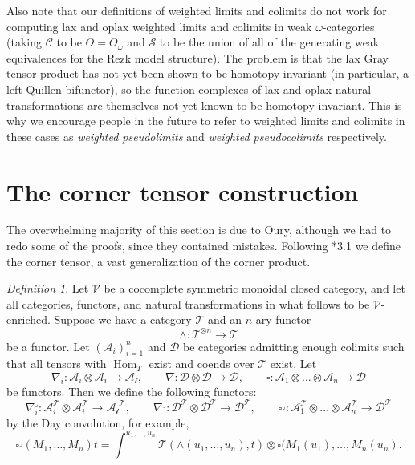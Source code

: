 \documentclass{amsart}
\numberwithin{equation}{section}
\theoremstyle{plain}   %
\theoremstyle{remark}
\newtheorem{defn}[subsection]{Definition}
\theoremstyle{plain}
\DeclareMathOperator{\Hom}{Hom}
\newcommand{\C}{\ensuremath{\mathcal{C}}}
\newcommand{\setS}{\ensuremath{\mathscr{S}}}
\begin{document}
Also note that our definitions of weighted limits and colimits do not work for computing lax and oplax weighted limits and colimits in weak \(\omega\)-categories (taking \(\C\) to be \(\Theta=\Theta_\omega\) and \(\setS\) to be the union of all of the generating weak equivalences for the Rezk model structure).  The problem is that the lax Gray tensor product has not yet been shown to be homotopy-invariant (in particular, a left-Quillen bifunctor), so the function complexes of lax and oplax natural transformations are themselves not yet known to be homotopy invariant.  This is why we encourage people in the future to refer to weighted limits and colimits in these cases as \emph{weighted pseudolimits} and \emph{weighted pseudocolimits} respectively.


\appendix
\renewcommand{\thesection}{A.\arabic{section}}
\section{The corner tensor construction}\label{cornertensor} 
The overwhelming majority of this section is due to Oury, although we had to redo some of the proofs, since they contained mistakes. Following \cite{oury}*{3.1} we define the corner tensor, a vast generalization of the corner product.
\begin{defn}
	Let \(\mathcal{V}\) be a cocomplete symmetric monoidal closed category, and let all categories, functors, and natural transformations in what follows to be \(\mathcal{V}\)-enriched.  Suppose we have a category \(\mathcal{T}\) and an \(n\)-ary functor \[\wedge:\mathcal{T}^{\otimes n} \to \mathcal{T}\] be a functor.  Let \((\mathcal{A}_i)_{i=1}^n\) and \(\mathcal{D}\) be categories admitting enough colimits such that all tensors with \(\Hom_T\) exist and coends over \(\mathcal{T}\) exist.  Let
	\[\nabla_i: \mathcal{A}_i \otimes \mathcal{A}_i \to \mathcal{A_i}, \qquad \nabla:\mathcal{D}\otimes \mathcal{D} \to \mathcal{D}, \qquad \square:\mathcal{A}_1\otimes\dots \otimes \mathcal{A}_n \to \mathcal{D}\]
	be functors.  Then we define the following functors:
	\[\nabla^\lrcorner_i: \mathcal{A}^\mathcal{T}_i \otimes \mathcal{A}^\mathcal{T}_i \to \mathcal{A_i}^\mathcal{T}, \qquad \nabla^\lrcorner:\mathcal{D}^\mathcal{T}\otimes \mathcal{D}^\mathcal{T} \to \mathcal{D}^\mathcal{T}, \qquad \square^\lrcorner: \mathcal{A}_1^\mathcal{T}\otimes\dots \otimes \mathcal{A}_n^\mathcal{T} \to \mathcal{D}^\mathcal{T}\]
	by the Day convolution, for example,
	\[\square^\lrcorner(M_1,\dots,M_n)t = \int^{u_1,\dots,u_n} \mathcal{T}(\wedge(u_1,\dots,u_n),t) \otimes \square(M_1(u_1),\dots,M_n(u_n).\]
\end{defn}
\end{document}
